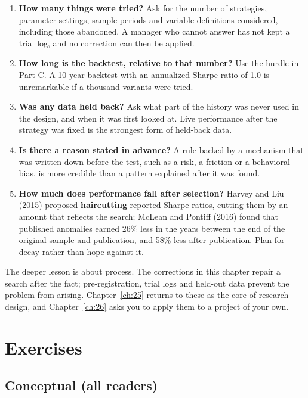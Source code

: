 \begin{enumerate}
  \item \textbf{How many things were tried?} Ask for the number of strategies, parameter settings, sample periods and variable definitions considered, including those abandoned. A manager who cannot answer has not kept a trial log, and no correction can then be applied.
  \item \textbf{How long is the backtest, relative to that number?} Use the hurdle in Part C. A 10-year backtest with an annualized Sharpe ratio of 1.0 is unremarkable if a thousand variants were tried.
  \item \textbf{Was any data held back?} Ask what part of the history was never used in the design, and when it was first looked at. Live performance after the strategy was fixed is the strongest form of held-back data.
  \item \textbf{Is there a reason stated in advance?} A rule backed by a mechanism that was written down before the test, such as a risk, a friction or a behavioral bias, is more credible than a pattern explained after it was found.
  \item \textbf{How much does performance fall after selection?} Harvey and Liu (2015) proposed \textbf{haircutting} reported Sharpe ratios, cutting them by an amount that reflects the search; McLean and Pontiff (2016) found that published anomalies earned 26\% less in the years between the end of the original sample and publication, and 58\% less after publication. Plan for decay rather than hope against it.
\end{enumerate}

The deeper lesson is about process. The corrections in this chapter repair a search after the fact; pre-registration, trial logs and held-out data prevent the problem from arising. Chapter~\ref{ch:25} returns to these as the core of research design, and Chapter~\ref{ch:26} asks you to apply them to a project of your own.

\section*{Exercises}

\subsection*{Conceptual (all readers)}

